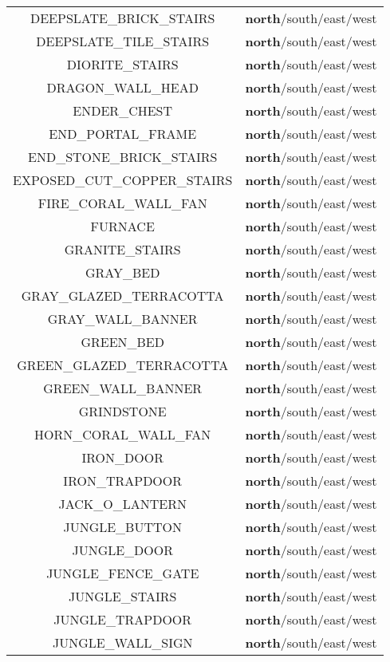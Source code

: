 \begin{longtable}{ |c|c| }
	DEEPSLATE\_BRICK\_STAIRS & \textbf{north}/south/east/west \\
	DEEPSLATE\_TILE\_STAIRS & \textbf{north}/south/east/west \\
	DIORITE\_STAIRS & \textbf{north}/south/east/west \\
	DRAGON\_WALL\_HEAD & \textbf{north}/south/east/west \\
	ENDER\_CHEST & \textbf{north}/south/east/west \\
	END\_PORTAL\_FRAME & \textbf{north}/south/east/west \\
	END\_STONE\_BRICK\_STAIRS & \textbf{north}/south/east/west \\
	EXPOSED\_CUT\_COPPER\_STAIRS & \textbf{north}/south/east/west \\
	FIRE\_CORAL\_WALL\_FAN & \textbf{north}/south/east/west \\
	FURNACE & \textbf{north}/south/east/west \\
	GRANITE\_STAIRS & \textbf{north}/south/east/west \\
	GRAY\_BED & \textbf{north}/south/east/west \\
	GRAY\_GLAZED\_TERRACOTTA & \textbf{north}/south/east/west \\
	GRAY\_WALL\_BANNER & \textbf{north}/south/east/west \\
	GREEN\_BED & \textbf{north}/south/east/west \\
	GREEN\_GLAZED\_TERRACOTTA & \textbf{north}/south/east/west \\
	GREEN\_WALL\_BANNER & \textbf{north}/south/east/west \\
	GRINDSTONE & \textbf{north}/south/east/west \\
	HORN\_CORAL\_WALL\_FAN & \textbf{north}/south/east/west \\
	IRON\_DOOR & \textbf{north}/south/east/west \\
	IRON\_TRAPDOOR & \textbf{north}/south/east/west \\
	JACK\_O\_LANTERN & \textbf{north}/south/east/west \\
	JUNGLE\_BUTTON & \textbf{north}/south/east/west \\
	JUNGLE\_DOOR & \textbf{north}/south/east/west \\
	JUNGLE\_FENCE\_GATE & \textbf{north}/south/east/west \\
	JUNGLE\_STAIRS & \textbf{north}/south/east/west \\
	JUNGLE\_TRAPDOOR & \textbf{north}/south/east/west \\
	JUNGLE\_WALL\_SIGN & \textbf{north}/south/east/west \\

\end{longtable}
